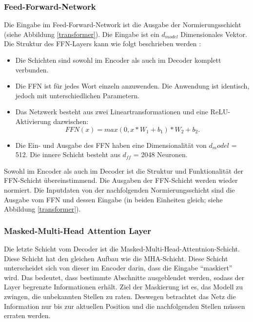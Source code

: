 \subsubsection{Feed-Forward-Network}

Die Eingabe im Feed-Forward-Network ist die Ausgabe der Normierungsschicht (siehe Abbildung \ref{transformer}). Die Eingabe ist ein $d_{model}$ Dimensionales Vektor. Die Struktur des FFN-Layers kann wie folgt beschrieben werden \cite{Vaswani:2017}:

\begin{itemize}[leftmargin=1cm]
	\item Die Schichten sind sowohl im Encoder als auch im Decoder komplett verbunden.
	
	\item Die FFN ist für jedes Wort einzeln anzuwenden. Die Anwendung ist identisch, jedoch mit unterschiedlichen Parametern.
	
	\item Das Netzwerk besteht aus zwei Lineartransformationen und eine ReLU-Aktivierung dazwischen:
	\begin{equation}
		FFN(x) = max(0, x*W_1 + b_1)*W_2 + b_2.
	\end{equation}
	
	\item Die Ein- und Ausgabe des FFN haben eine Dimensionalität von $d_model$ = 512. Die innere Schicht besteht aus $d_{ff}$	= 2048 Neuronen.
\end{itemize}

Sowohl im Encoder als auch im Decoder ist die Struktur und Funktionalität der FFN-Schicht übereinstimmend. Die Ausgaben der FFN-Schicht werden wieder normiert. Die Inputdaten von der nachfolgenden Normierungsschicht sind die Ausgabe vom FFN und dessen Eingabe (in beiden Einheiten gleich; siehe Abbildung \ref{transformer}).


\subsubsection{Masked-Multi-Head Attention Layer}

Die letzte Schicht vom Decoder ist die Masked-Multi-Head-Attentnion-Schicht. Diese Schicht hat den gleichen Aufbau wie die MHA-Schicht. Diese Schicht unterscheidet sich von dieser im Encoder darin, dass die Eingabe  ``maskiert'' wird. Das bedeutet, dass bestimmte Abschnitte ausgeblendet werden, sodass der Layer begrenzte Informationen erhält. Ziel der Maskierung ist es, das Modell zu zwingen, die unbekannten Stellen zu raten. Deswegen betrachtet das Netz die Information nur bis zur aktuellen Position und die nachfolgenden Stellen müssen erraten werden.
